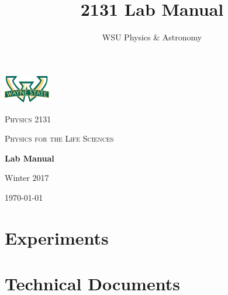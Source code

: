 \documentclass[hidelinks,12pt,letterpaper,twoside]{book}
\author{WSU Physics \& Astronomy}
\title{2131 Lab Manual}
\newcommand\blankpage{%
    \null
    \thispagestyle{empty}%
    \newpage}
\begin{document}
\begin{titlepage}
	\centering
	\includegraphics[width=0.15\textwidth]{wsu_logo}\par\vspace{1cm}
	{\scshape\LARGE Physics 2131 \par}
	\vspace{0.5cm}
	{\scshape\large Physics for the Life Sciences\par}
	\vfill
	{\huge\bfseries Lab Manual \par}
	\vfill
	{\large Winter 2017 \par}
	{\large \today\par}
\end{titlepage}

\newpage{\blankpage}




\renewcommand\contentsname{PHY 2131: Physics for Life Sciences}
\setcounter{tocdepth}{1}
\tableofcontents{\thispagestyle{fancy}}


\part{Experiments}
\renewcommand{\chaptername}{Experiment}






\newpage{\blankpage}


\part{Technical Documents}
\renewcommand{\chaptername}{Technical Document}
\renewcommand\thechapter{\Alph{chapter}}
\newpage{\blankpage}
\newpage{\blankpage}
\newpage{\blankpage}
\newpage{\blankpage}
\end{document}
